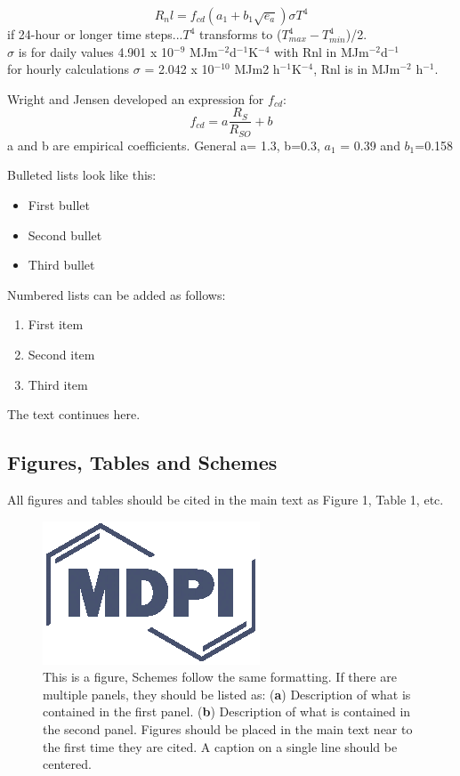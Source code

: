 \documentclass[hydrology,article,submit,moreauthors,pdftex]{Definitions/mdpi}
\begin{document}
\begin{equation}
R_nl = f_{cd} (a_1+b_1\sqrt{e_a})\sigma T^4
\end{equation}
if 24-hour or longer time steps...$T^4$ transforms to ($T^4_{max}-T^4_{min}$)/2. \\
$\sigma$ is for daily values 4.901 x 10$^{-9}$ MJm$^{-2}$d$^{-1}$K$^{-4}$ with Rnl in MJm$^{-2}$d$^{-1}$ \\
for hourly calculations $\sigma$ = 2.042 x 10$^{-10}$ MJm2 h$^{-1}$K$^{-4}$, Rnl is in MJm$^{-2}$ h$^{-1}$.

Wright and Jensen \cite{wright1972peak} developed an expression for $f_{cd}$:
\begin{equation}
f_{cd} = a \frac{R_S}{R_{SO}} + b
\end{equation}
a and b are empirical coefficients. General a= 1.3, b=0.3, $a_1$ = 0.39 and $b_1$=0.158

%
%
%
%
%
%
%
%
%
%
%
%
%

Bulleted lists look like this:
\begin{itemize}[leftmargin=*,labelsep=5.8mm]
\item	First bullet
\item	Second bullet
\item	Third bullet
\end{itemize}

Numbered lists can be added as follows:
\begin{enumerate}[leftmargin=*,labelsep=4.9mm]
\item	First item 
\item	Second item
\item	Third item
\end{enumerate}

The text continues here.

\subsection{Figures, Tables and Schemes}

All figures and tables should be cited in the main text as Figure 1, Table 1, etc.

\begin{figure}[H]
\centering
\includegraphics[width=2 cm]{Definitions/logo-mdpi}
\caption{This is a figure, Schemes follow the same formatting. If there are multiple panels, they should be listed as: (\textbf{a}) Description of what is contained in the first panel. (\textbf{b}) Description of what is contained in the second panel. Figures should be placed in the main text near to the first time they are cited. A caption on a single line should be centered.}
\end{figure}   
 
\end{document}
